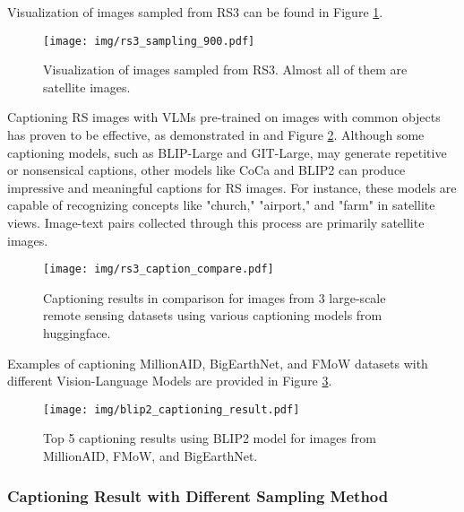 \documentclass[journal]{IEEEtran}
\begin{document}
Visualization of images sampled from RS3 can be found in Figure \ref{fig:rs3_pure_image}.

\begin{figure}[H]
    \centering
    \texttt{[image: img/rs3\_sampling\_900.pdf]}
    \caption{Visualization of images sampled from RS3. Almost all of them are satellite images.}
    \label{fig:rs3_pure_image}
\end{figure}

Captioning RS images with VLMs pre-trained on images with common objects has proven to be effective, as demonstrated in \cite{blip} and Figure \ref{fig:caption_compare}. Although some captioning models, such as BLIP-Large and GIT-Large, may generate repetitive or nonsensical captions, other models like CoCa and BLIP2 can produce impressive and meaningful captions for RS images. For instance, these models are capable of recognizing concepts like "church," "airport," and "farm" in satellite views. Image-text pairs collected through this process are primarily satellite images. 


\begin{figure}[H]
    \centering
    \texttt{[image: img/rs3\_caption\_compare.pdf]}
    \caption{Captioning results in comparison for images from 3 large-scale remote sensing datasets using various captioning models from huggingface.} 
    \label{fig:caption_compare}
\end{figure}










Examples of captioning MillionAID, BigEarthNet, and FMoW datasets with different Vision-Language Models are provided in Figure \ref{fig:blip2_captioning_result}.

\begin{figure}[H]
    \centering
    \texttt{[image: img/blip2\_captioning\_result.pdf]}
    \caption{Top 5 captioning results using BLIP2 model for images from MillionAID, FMoW, and BigEarthNet.} 
    \label{fig:blip2_captioning_result}
\end{figure}


\subsubsection{Captioning Result with Different Sampling Method}
\label{sampleing_method}
\end{document}

